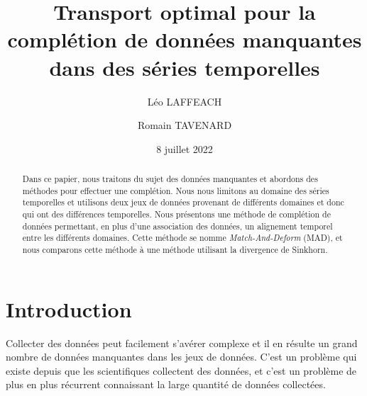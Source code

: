 \documentclass[acmsmall, natbib=false, nonacm]{acmart}
\begin{document}
\title{\textbf{Transport optimal pour la complétion de données manquantes dans des séries temporelles}}
\author{Léo LAFFEACH}
\author{Romain TAVENARD}
\date{8 juillet 2022}

\begin{abstract}
Dans ce papier, nous traitons du sujet des données manquantes et abordons des méthodes pour effectuer une complétion.
Nous nous limitons au domaine des séries temporelles et utilisons deux jeux de données provenant de différents domaines et donc qui ont des différences temporelles.
Nous présentons une méthode de complétion de données permettant, en plus d'une association des données, un alignement temporel entre les différents domaines. Cette méthode se nomme \textit{Match-And-Deform} (MAD),
et nous comparons cette méthode à une méthode utilisant la divergence de Sinkhorn.
\end{abstract}
\maketitle

\section{Introduction}
Collecter des données peut facilement s'avérer complexe et il en résulte un grand nombre de données manquantes dans les jeux de données.
C'est un problème qui existe depuis que les scientifiques collectent des données, et c'est un problème de plus en plus récurrent connaissant la large quantité de données collectées.
\end{document}
